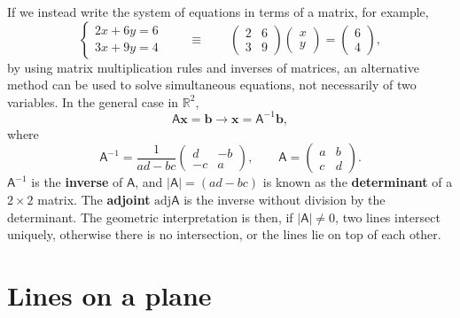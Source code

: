 \documentclass[letter-paper]{tufte-book}
\newcommand{\bb}{\boldsymbol{b}}
\newcommand{\xb}{\boldsymbol{x}}
\newcommand\Def[1]{\textbf{#1}}
\begin{document}
If we instead write the system of equations in terms of a matrix, for example,
\begin{equation*}
	\begin{cases}2x+6y=6\\ 3x+9y=4\end{cases}\qquad\equiv\qquad
	\begin{pmatrix}2 & 6\\ 3 & 9\end{pmatrix}\begin{pmatrix}x\\ y\end{pmatrix}
	=\begin{pmatrix}6\\ 4\end{pmatrix},
\end{equation*}
by using matrix multiplication rules and inverses of matrices, an alternative
method can be used to solve simultaneous equations, not necessarily of two
variables. In the general case in $\mathbb{R}^2$,
\begin{equation*}
	\mathsf{A}\xb=\bb\rightarrow \xb=\mathsf{A}^{-1}\bb,
\end{equation*}
where
\begin{equation}
	\mathsf{A}^{-1}=\frac{1}{ad-bc}\begin{pmatrix}d & -b\\ -c & a\end{pmatrix},
	\qquad \mathsf{A}=\begin{pmatrix}a & b\\ c & d\end{pmatrix}.
\end{equation}
$\mathsf{A}^{-1}$ is the \Def{inverse} of $\mathsf{A}$, and
$|\mathsf{A}|=(ad-bc)$ is known as the \Def{determinant} of a $2\times2$
matrix. The \Def{adjoint} $\mbox{adj}\mathsf{A}$ is the inverse without
division by the determinant. The geometric interpretation is then, if
$|\mathsf{A}|\neq0$, two lines intersect uniquely, otherwise there is no
intersection, or the lines lie on top of each other.


\section{Lines on a plane}
\end{document}
